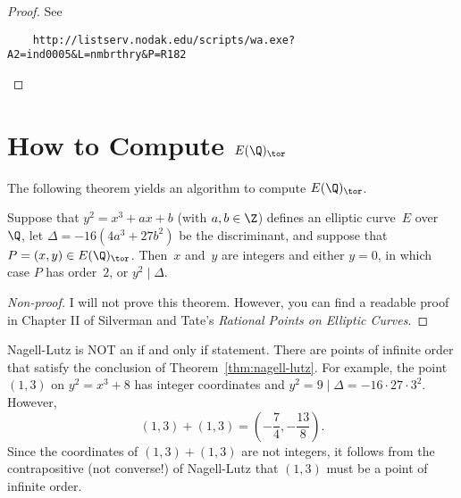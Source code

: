 \documentclass[11pt]{report}
\begin{document}
\begin{proof}
  See
  \begin{verbatim}
    http://listserv.nodak.edu/scripts/wa.exe?A2=ind0005&L=nmbrthry&P=R182
\end{verbatim}
\end{proof}


\section{How to Compute $E(\Q)_{\tor}$}
The following theorem yields an algorithm to compute $E(\Q)_{\tor}$.
\begin{theorem}\label{thm:nagell-lutz}
  Suppose that $y^2 = x^3 + ax + b$ (with $a,b\in\Z$) defines an elliptic
  curve~$E$ over~$\Q$, let $\Delta = -16(4a^3 + 27b^2)$ be the discriminant,
  and suppose
  that $P=(x,y)\in E(\Q)_{\tor}$. Then~$x$ and~$y$ are integers and
  either $y=0$, in which case $P$ has order~$2$, or $y^2 \mid \Delta$.
\end{theorem}
\begin{proof}[Non-proof]
  I will not prove this theorem.  However, you can find a readable
  proof in Chapter II of Silverman and Tate's {\em Rational Points on Elliptic Curves}.
\end{proof}

Nagell-Lutz is NOT an if and only if statement.  There are
points of infinite order that satisfy the conclusion
of Theorem~\ref{thm:nagell-lutz}.
For example, the point $(1,3)$ on $y^2 = x^3 + 8$ has integer coordinates
and $y^2 = 9 \mid \Delta = -16\cdot 27\cdot 3^2$.  However,
$$
  (1,3) + (1,3) = \left( -\frac{7}{4}, -\frac{13}{8}\right).
$$
Since the coordinates of $(1,3)+(1,3)$ are not integers, it
follows from the contrapositive (not converse!) of
Nagell-Lutz that $(1,3)$ must be a point of infinite order.
\end{document}
